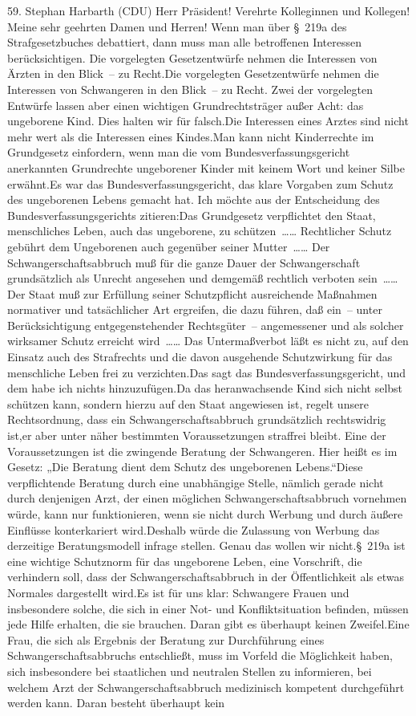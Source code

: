 \documentclass{article}
\begin{document}
	59. Stephan Harbarth (CDU) Herr Präsident! Verehrte Kolleginnen und Kollegen! Meine sehr geehrten Damen und Herren! Wenn man über § 219a des Strafgesetzbuches debattiert, dann muss man alle betroffenen Interessen berücksichtigen. Die vorgelegten Gesetzentwürfe nehmen die Interessen von Ärzten in den Blick – zu Recht.Die vorgelegten Gesetzentwürfe nehmen die Interessen von Schwangeren in den Blick – zu Recht. Zwei der vorgelegten Entwürfe lassen aber einen wichtigen Grundrechtsträger außer Acht: das ungeborene Kind. Dies halten wir für falsch.Die Interessen eines Arztes sind nicht mehr wert als die Interessen eines Kindes.Man kann nicht Kinderrechte im Grundgesetz einfordern, wenn man die vom Bundesverfassungsgericht anerkannten Grundrechte ungeborener Kinder mit keinem Wort und keiner Silbe erwähnt.Es war das Bundesverfassungsgericht, das klare Vorgaben zum Schutz des ungeborenen Lebens gemacht hat. Ich möchte aus der Entscheidung des Bundesverfassungsgerichts zitieren:Das Grundgesetz verpflichtet den Staat, menschliches Leben, auch das ungeborene, zu schützen …… Rechtlicher Schutz gebührt dem Ungeborenen auch gegenüber seiner Mutter …… Der Schwangerschaftsabbruch muß für die ganze Dauer der Schwangerschaft grundsätzlich als Unrecht angesehen und demgemäß rechtlich verboten sein …… Der Staat muß zur Erfüllung seiner Schutzpflicht ausreichende Maßnahmen normativer und tatsächlicher Art ergreifen, die dazu führen, daß ein – unter Berücksichtigung entgegenstehender Rechtsgüter – angemessener und als solcher wirksamer Schutz erreicht wird …… Das Untermaßverbot läßt es nicht zu, auf den Einsatz auch des Strafrechts und die davon ausgehende Schutzwirkung für das menschliche Leben frei zu verzichten.Das sagt das Bundesverfassungsgericht, und dem habe ich nichts hinzuzufügen.Da das heranwachsende Kind sich nicht selbst schützen kann, sondern hierzu auf den Staat angewiesen ist, regelt unsere Rechtsordnung, dass ein Schwangerschaftsabbruch grundsätzlich rechtswidrig ist,er aber unter näher bestimmten Voraussetzungen straffrei bleibt. Eine der Voraussetzungen ist die zwingende Beratung der Schwangeren. Hier heißt es im Gesetz: „Die Beratung dient dem Schutz des ungeborenen Lebens.“Diese verpflichtende Beratung durch eine unabhängige Stelle, nämlich gerade nicht durch denjenigen Arzt, der einen möglichen Schwangerschaftsabbruch vornehmen würde, kann nur funktionieren, wenn sie nicht durch Werbung und durch äußere Einflüsse konterkariert wird.Deshalb würde die Zulassung von Werbung das derzeitige Beratungsmodell infrage stellen. Genau das wollen wir nicht.§ 219a ist eine wichtige Schutznorm für das ungeborene Leben, eine Vorschrift, die verhindern soll, dass der Schwangerschaftsabbruch in der Öffentlichkeit als etwas Normales dargestellt wird.Es ist für uns klar: Schwangere Frauen und insbesondere solche, die sich in einer Not- und Konfliktsituation befinden, müssen jede Hilfe erhalten, die sie brauchen. Daran gibt es überhaupt keinen Zweifel.Eine Frau, die sich als Ergebnis der Beratung zur Durchführung eines Schwangerschaftsabbruchs entschließt, muss im Vorfeld die Möglichkeit haben, sich insbesondere bei staatlichen und neutralen Stellen zu informieren, bei welchem Arzt der Schwangerschaftsabbruch medizinisch kompetent durchgeführt werden kann. Daran besteht überhaupt kein 
\end{document}
